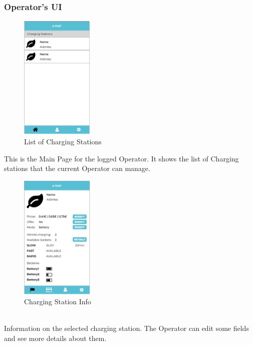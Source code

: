 \documentclass[../main.tex]{subfiles}
\begin{document}
\subsubsection{Operator's UI}
\begin{figure}[!htb]
  \centering
  \begin{minipage}[b]{\textwidth}
  \centering
    \includegraphics[width=35mm]{Mockups/mk_op_listcss.png}
    \caption{List of Charging Stations}
    \label{fig:class}
  \end{minipage}
  \hfill
  \end{figure}
  \noindent
This is the Main Page for the logged Operator. It shows the list of Charging stations that the current Operator can manage.

  \begin{figure}[!htb]
  \centering
  \begin{minipage}[b]{\textwidth}
    \centering
    \includegraphics[width=35mm]{Mockups/mk_op_csinfo.png}
    \caption{Charging Station Info}
    \label{mk:opcs}
  \end{minipage}
\end{figure}\\
Information on the selected charging station. The Operator can edit some fields and see more details about them.
\newpage
\end{document}
